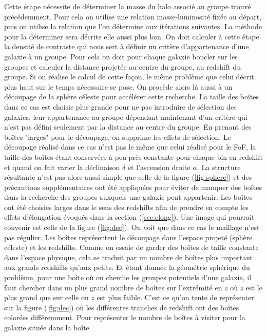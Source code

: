 Cette étape nécessite de déterminer la masse du halo associé au groupe trouvé précédemment. Pour cela on utilise une relation
masse-luminosité fixée au départ, puis on utilise la relation que l'on détermine aux itérations suivantes. La méthode pour la
déterminer sera décrite elle aussi plus loin.
On doit calculer à cette étape la densité de contraste qui nous sert à définir un critère d'appartenance d'une galaxie à un groupe.
Pour cela on doit pour chaque galaxie boucler sur les groupes et calculer la distance projetée au centre du groupe, au redshift du
groupe. Si on réalise le calcul de cette façon, le même problème que celui décrit plus haut sur le temps nécessaire se pose. On
procède alors là aussi à un découpage de la sphère céleste pour accélérer cette recherche. La taille des boîtes dans ce cas est
choisie plus grande pour ne pas introduire de sélection des galaxies, leur appartenance au groupe dépendant maintenant d'un critère
qui n'est pas défini seulement par la distance au centre du groupe. En prenant des boîtes "larges" pour le découpage, on supprime
les effets de sélection. Le découpage réalisé dans ce cas n'est pas le même que celui réalisé pour le FoF, la taille des boîtes
étant conservées à peu près constante pour chaque bin en redshift et quand on fait varier la déclinaison $\delta$ et l'ascension
droite $\alpha$. La structure résultante n'est pas alors aussi simple que celle de la figure (\ref{fig:sphere}) et des précautions
supplémentaires ont été appliquées pour éviter de manquer des boîtes dans la recherche des groupes auxquels une galaxie peut
appartenir. Les boîtes ont été choisies larges dans le sens des redshifts afin de prendre en compte les effets d'élongation évoqués
dans la section (\ref{sec:elong}). Une image qui pourrait convenir est celle de la figure (\ref{fig:dec}). On voit que dans ce cas
le maillage n'est pas régulier. Les boîtes représentent le découpage dans l'espace projeté (sphère céleste) et les redshifts. Comme
on essaie de garder des boîtes de taille constante dans l'espace physique, cela se traduit par un nombre de boîtes plus important
aux grands redshifts qu'aux petits. Et étant donnée la géométrie sphérique du problème, pour une boîte où on cherche les groupes
potentiels d'une galaxie, il faut chercher dans un plus grand nombre de boîtes sur l'extrémité en $z$ où $z$ est le plus grand que
sur celle ou $z$ est plus faible. C'est ce qu'on tente de représenter sur la figure (\ref{fig:dec}) où les différentes tranches de
redshift ont des boîtes colorées différemment. Pour représenter le nombre de boîtes à visiter pour la galaxie située dans la boîte
